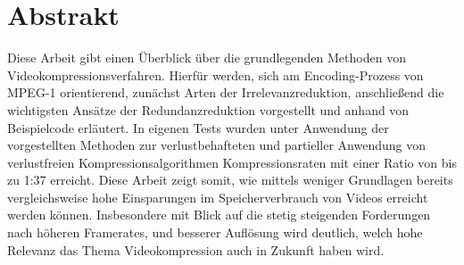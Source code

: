 \chapter{Abstrakt}
Diese Arbeit gibt einen Überblick über die grundlegenden Methoden von Videokompressionsverfahren. Hierfür werden, sich am Encoding-Prozess von MPEG-1 orientierend, zunächst Arten der Irrelevanzreduktion, anschließend die wichtigsten Ansätze der Redundanzreduktion vorgestellt und anhand von Beispielcode erläutert. In eigenen Tests wurden unter Anwendung der vorgestellten Methoden zur verlustbehafteten und partieller Anwendung von verlustfreien Kompressionsalgorithmen Kompressionsraten mit einer Ratio von bis zu 1:37 erreicht. Diese Arbeit zeigt somit, wie mittels weniger Grundlagen bereits vergleichsweise hohe Einsparungen im Speicherverbrauch von Videos erreicht werden können. Insbesondere mit Blick auf die stetig steigenden Forderungen nach höheren Framerates, und besserer Auflösung wird deutlich, welch hohe Relevanz das Thema Videokompression auch in Zukunft haben wird.
